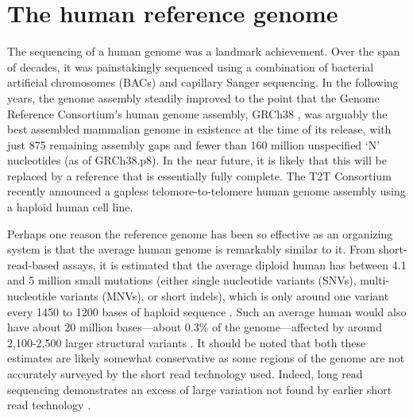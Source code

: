 \documentclass[11pt]{ucthesis}
\begin{document}
\section{The human reference genome}

The sequencing of a human genome was a landmark achievement. Over the span of decades, it was painstakingly sequenced using a combination of bacterial artificial chromosomes (BACs) and capillary Sanger sequencing\cite{lander2001initial}. In the following years, the genome assembly steadily improved \cite{international2004finishing,church2011modernizing} to the point that the Genome Reference Consortium's human genome assembly, GRCh38 \cite{schneider2017evaluation}, was arguably the best assembled mammalian genome in existence at the time of its release, with just 875 remaining assembly gaps and fewer than 160 million unspecified `N' nucleotides (as of GRCh38.p8). In the near future, it is likely that this will be replaced by a reference that is essentially fully complete. The T2T Consortium recently announced a gapless telomore-to-telomere human genome assembly using a haploid human cell line\cite{nurk2021complete}. 



Perhaps one reason the reference genome has been so effective as an organizing system is that the average human genome is remarkably similar to it. From short-read-based assays, it is estimated that the average diploid human has between 4.1 and 5 million small mutations (either single nucleotide variants (SNVs), multi-nucleotide variants (MNVs), or short indels), which is only around one variant every 1450 to 1200 bases of haploid sequence \cite{10002015global}. Such an average human would also have about 20 million bases---about 0.3\% of the genome---affected by around 2,100-2,500 larger structural variants \cite{10002015global}. It should be noted that both these estimates are likely somewhat conservative as some regions of the genome are not accurately surveyed by the short read technology used. Indeed, long read sequencing demonstrates an excess of large variation not found by earlier short read technology \cite{chaisson2015resolving,seo2016novo}.
\end{document}

